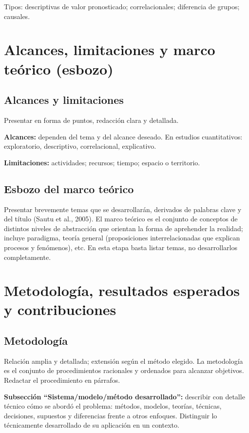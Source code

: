 \documentclass[a4paper,11pt]{book}
\begin{document}
Tipos: descriptivas de valor pronosticado; correlacionales; diferencia de grupos; causales.

\chapter{Alcances, limitaciones y marco teórico (esbozo)}
\label{cap:alcance}

\section{Alcances y limitaciones}
Presentar en forma de puntos, redacción clara y detallada.

\textbf{Alcances:} dependen del tema y del alcance deseado. En estudios cuantitativos: exploratorio, descriptivo, correlacional, explicativo.

\textbf{Limitaciones:} actividades; recursos; tiempo; espacio o territorio.

\section{Esbozo del marco teórico}
Presentar brevemente temas que se desarrollarán, derivados de palabras clave y del título (Sautu et al., 2005). El marco teórico es el conjunto de conceptos de distintos niveles de abstracción que orientan la forma de aprehender la realidad; incluye paradigma, teoría general (proposiciones interrelacionadas que explican procesos y fenómenos), etc. En esta etapa basta listar temas, no desarrollarlos completamente.

\chapter{Metodología, resultados esperados y contribuciones}
\label{cap:metodologia}

\section{Metodología}
Relación amplia y detallada; extensión según el método elegido. La metodología es el conjunto de procedimientos racionales y ordenados para alcanzar objetivos. Redactar el procedimiento en párrafos.

\textbf{Subsección ``Sistema/modelo/método desarrollado'':} describir con detalle técnico cómo se abordó el problema: métodos, modelos, teorías, técnicas, decisiones, supuestos y diferencias frente a otros enfoques. Distinguir lo técnicamente desarrollado de su aplicación en un contexto.
\end{document}
